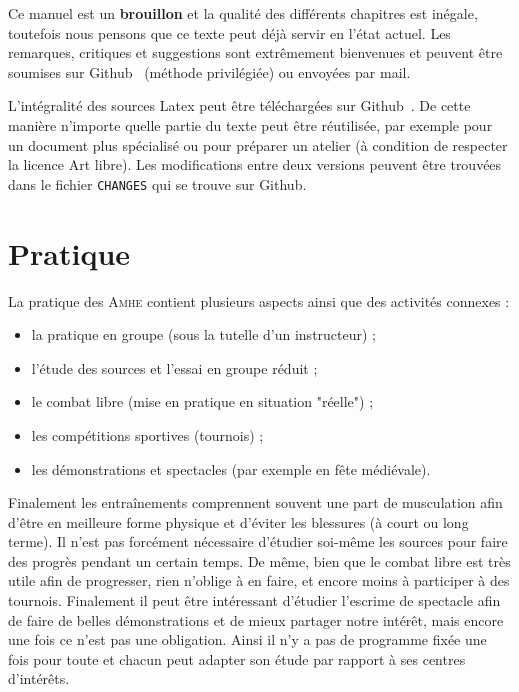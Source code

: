 Ce manuel est un \textbf{brouillon} et la qualité des différents chapitres est inégale, toutefois nous pensons que ce texte peut déjà servir en l'état actuel.
Les remarques, critiques et suggestions sont extrêmement bienvenues et peuvent être soumises sur Github~\footnotemark{} (méthode privilégiée) ou envoyées par mail.

L'intégralité des sources Latex peut être téléchargées sur Github~\footnotemark{}.
De cette manière n'importe quelle partie du texte peut être réutilisée, par exemple pour un document plus spécialisé ou pour préparer un atelier (à condition de respecter la licence Art libre).
Les modifications entre deux versions peuvent être trouvées dans le fichier \texttt{CHANGES} qui se trouve sur Github.





\section{Pratique}


\noindent
La pratique des \textsc{Amhe} contient plusieurs aspects ainsi que des activités connexes :
\begin{itemize}
	\item la pratique en groupe (sous la tutelle d'un instructeur) ;
	\item l'étude des sources et l'essai en groupe réduit ;
	\item le combat libre (mise en pratique en situation "réelle") ;
	\item les compétitions sportives (tournois) ;
	\item les démonstrations et spectacles (par exemple en fête médiévale).
\end{itemize}
Finalement les entraînements comprennent souvent une part de musculation afin d'être en meilleure forme physique et d'éviter les blessures (à court ou long terme).
Il n'est pas forcément nécessaire d'étudier soi-même les sources pour faire des progrès pendant un certain temps.
De même, bien que le combat libre est très utile afin de progresser, rien n'oblige à en faire, et encore moins à participer à des tournois.
Finalement il peut être intéressant d'étudier l'escrime de spectacle afin de faire de belles démonstrations et de mieux partager notre intérêt, mais encore une fois ce n'est pas une obligation.
Ainsi il n'y a pas de programme fixée une fois pour toute et chacun peut adapter son étude par rapport à ses centres d'intérêts.


